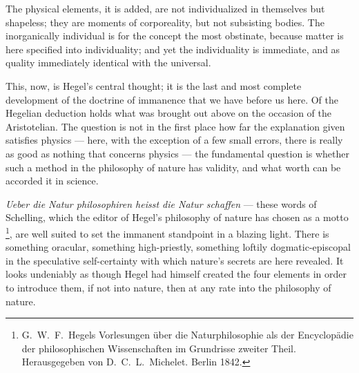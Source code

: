 \documentclass[12pt,a4paper]{book}
\begin{document}
The physical elements, it is added, are not individualized in themselves but shapeless; they are moments of
corporeality, but not subsisting bodies. The inorganically individual is for the concept the most obstinate, because
matter is here specified into individuality; and yet the individuality is immediate, and as quality immediately
identical with the universal.

This, now, is Hegel's central thought; it is the last and most complete development of the doctrine of immanence that
we have before us here. Of the Hegelian deduction holds what was brought out above on the occasion of the Aristotelian.
The question is not in the first place how far the explanation given satisfies physics --- here, with the exception of
a few
small errors, there is really as good as nothing that concerns physics --- the fundamental question is whether such a
method in the philosophy of nature has validity, and what worth can be accorded it in science.

\textit{Ueber die Natur philosophiren heisst die Natur schaffen} --- these words of Schelling, which the editor of
Hegel's philosophy of nature has chosen as a motto%
\footnote{%
G.\ W.\ F.\ Hegels Vorlesungen über die Naturphilosophie als der Encyclopädie der philosophischen Wissenschaften im
Grundrisse zweiter Theil. Herausgegeben von D.\ C.\ L.\ Michelet. Berlin 1842.}, are well suited to set the immanent
standpoint in a blazing light. There is something oracular, something high-priestly, something loftily
dogmatic-episcopal in the speculative self-certainty with which nature's secrets are here revealed. It looks
undeniably as though Hegel had himself created the four elements in order to introduce them, if not into nature, then
at any rate into the philosophy of nature.
\end{document}
